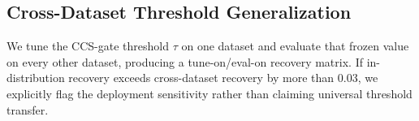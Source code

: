 
\subsection{Cross-Dataset Threshold Generalization}
\label{sec:fix04_tau_generalization}

We tune the CCS-gate threshold $\tau$ on one dataset and evaluate that
frozen value on every other dataset, producing a tune-on/eval-on recovery
matrix. If in-distribution recovery exceeds cross-dataset recovery by
more than 0.03, we explicitly flag the deployment sensitivity rather than
claiming universal threshold transfer.


